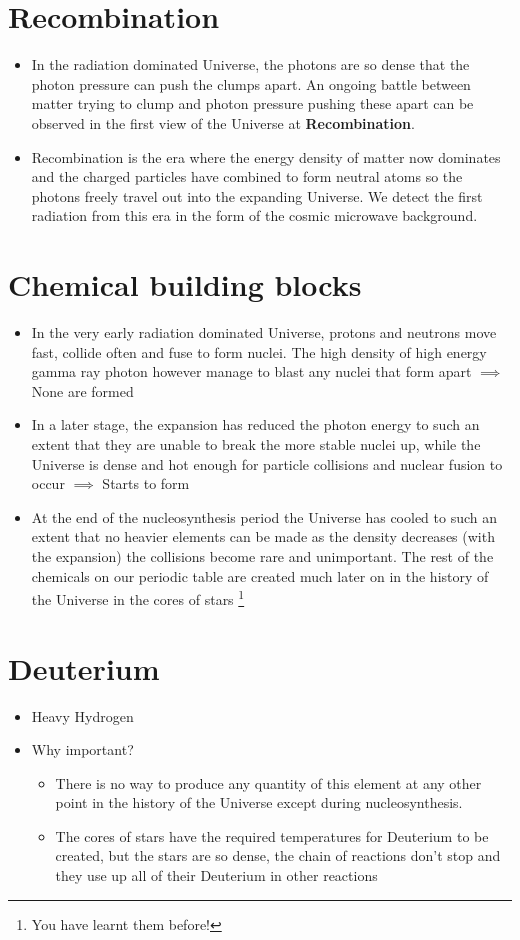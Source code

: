 \documentclass{article}
\begin{document}
\section{Recombination}
\begin{itemize}
\item In the radiation dominated Universe, the photons are so dense that the
photon pressure can push the clumps apart. An ongoing battle between matter trying to clump
and photon pressure pushing these apart can be observed in the first view of the Universe at
\textbf{Recombination}.
\item Recombination is the era where the energy density of matter now dominates and the charged
particles have combined to form neutral atoms so the photons freely travel out into the expanding
Universe. We detect the first radiation from this era in the form of the cosmic microwave
background.
\end{itemize}
\section{Chemical building blocks}
\begin{itemize}
\item In the very early radiation dominated Universe, protons and neutrons move fast, collide often and fuse to form nuclei. The high density of high energy gamma ray photon however manage to
blast any nuclei that form apart $\implies$ None are formed
\item In a later stage, the expansion has reduced the photon energy to such an extent that they are unable to break the more stable nuclei up, while the Universe is dense and hot
enough for particle collisions and nuclear fusion to occur $\implies$ Starts to form
\item At the end of the nucleosynthesis period the Universe has cooled to such an extent that no
heavier elements can be made as the density decreases (with the expansion) the collisions
become rare and unimportant. The rest of the chemicals on our periodic table are created much
later on in the history of the Universe in the cores of stars \footnote{You have learnt them before!}
\end{itemize}
\section{Deuterium}
\begin{itemize}
\item Heavy Hydrogen 
\item Why important?
\begin{itemize}
\item There is no way to produce any quantity of this element at
any other point in the history of the Universe except during nucleosynthesis.
\item  The cores of stars have the required temperatures for Deuterium to be created, but the stars are so dense, the chain of reactions don’t stop and they use up all of their Deuterium in other reactions
\end{itemize}
\end{itemize}
\end{document}

